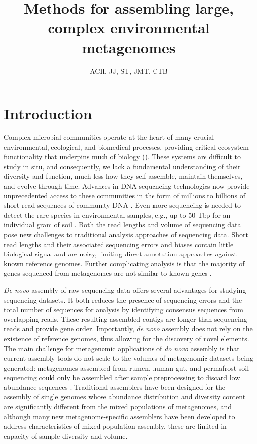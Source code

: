 \documentclass[11pt]{article} %
\begin{document}
\title{Methods for assembling large, complex environmental metagenomes}
\author{ACH, JJ, ST, JMT, CTB} 
\maketitle

\section{Introduction}  
Complex microbial communities operate at the heart of many crucial
environmental, ecological, and biomedical processes, providing
critical ecosystem functionality that underpins much of biology
(\cite{Arumugam:2011p735,Hess:2011p686,Iverson:2012p1281,
Mackelprang:2011p1087,Qin:2010p189,Tringe:2005p174,Venter:2004p170}).
These systems are difficult to study in situ, and consequently, we
lack a fundamental understanding of their diversity and function, much
less how they self-assemble, maintain themselves, and evolve through
time.  Advances in DNA sequencing technologies now provide
unprecedented access to these communities in the form of millions to
billions of short-read sequences of community DNA
\cite{Hess:2011p686,Mackelprang:2011p1087,Qin:2010p189}.  Even more
sequencing is needed to detect the rare species in environmental
samples, e.g., up to 50 Tbp for an individual gram of soil
\cite{Gans:2005p1365}.  Both the read lengths and volume of sequencing
data pose new challenges to traditional analysis approaches of
sequencing data.  Short read lengths and their associated sequencing
errors and biases contain little biological signal and are noisy,
limiting direct annotation approaches against known reference genomes.
Further complicating analysis is that the majority of genes sequenced
from metagenomes are not similar to known genes
\cite{Arumugam:2011p735,Qin:2010p189}.

\emph{De novo} assembly of raw sequencing data offers several
advantages for studying sequencing datasets.  It both reduces the
presence of sequencing errors and the total number of sequences for
analysis by identifying consensus sequences from overlapping reads.
These resulting assembled contigs are longer than sequencing reads and
provide gene order.  Importantly, \emph{de novo} assembly does not
rely on the existence of reference genomes, thus allowing for the
discovery of novel elements.  The main challenge for metagenomic
applications of \emph{do novo} assembly is that current assembly tools
do not scale to the volumes of metagenomic datasets being generated:
metagenomes assembled from rumen, human gut, and permafrost soil
sequencing could only be assembled after sample preprocessing to
discard low abundance sequences
\cite{Hess:2011p686,Mackelprang:2011p1087,Qin:2010p189}.  Traditional
assemblers have been designed for the assembly of single genomes whose
abundance distribution and diversity content are significantly
different from the mixed populations of metagenomes, and although many
new metagenome-specific assemblers have been developed to address
characteristics of mixed population assembly, these are limited in
capacity of sample diversity and volume.
\end{document}
